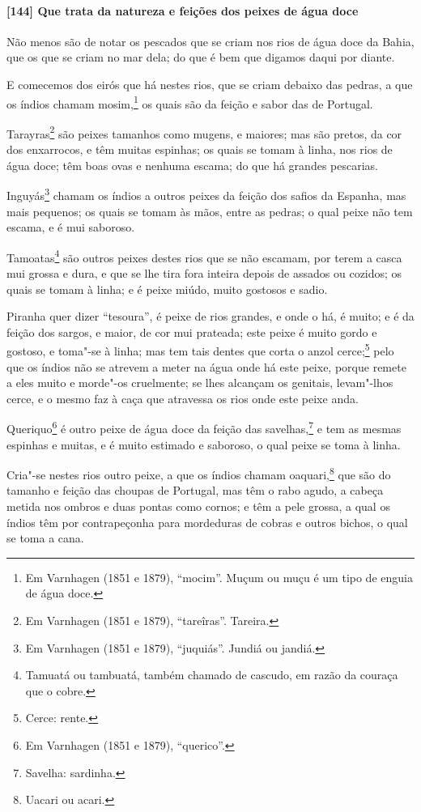 \begin{linenumbers}
\paragraph{[144] Que trata da natureza e feições dos peixes de água doce}\quad
Não menos são de notar os pescados que se criam nos rios de água doce da Bahia, que os que
se criam no mar dela; do que é bem que digamos daqui por diante.

E comecemos dos eirós que há nestes rios, que se criam debaixo das pedras, a que os índios
chamam mosim,\footnote{ Em Varnhagen (1851 e 1879), ``mocim''. Muçum ou muçu é um tipo de
enguia de água doce.} os quais são da feição e sabor das de Portugal.

Tarayras\footnote{ Em Varnhagen (1851 e 1879), ``tareîras''. Tareira.} são peixes tamanhos
como mugens, e maiores; mas são pretos, da cor dos enxarrocos, e têm muitas espinhas; os
quais se tomam à linha, nos rios de água doce; têm boas ovas e nenhuma escama; do que há
grandes pescarias.

Inguyás\footnote{ Em Varnhagen (1851 e 1879), ``juquiás''. Jundiá ou jandiá.} chamam os
índios a outros peixes da feição dos safios da Espanha, mas mais pequenos; os quais se
tomam às mãos, entre as pedras; o qual peixe não tem escama, e é mui saboroso.

Tamoatas\footnote{ Tamuatá ou tambuatá, também chamado de cascudo, em razão da couraça que
o cobre.} são outros peixes destes rios que se não escamam, por terem a casca mui grossa e
dura, e que se lhe tira fora inteira depois de assados ou cozidos; os quais se tomam à
linha; e é peixe miúdo, muito gostosos e sadio.

Piranha quer dizer ``tesoura'', é peixe de rios grandes, e onde o há, é muito; e é da
feição dos sargos, e maior, de cor mui prateada; este peixe é muito gordo e gostoso, e
toma"-se à linha; mas tem tais dentes que corta o anzol cerce;\footnote{ Cerce: rente.}
pelo que os índios não se atrevem a meter na água onde há este peixe, porque remete a eles
muito e morde"-os cruelmente; se lhes alcançam os genitais, levam"-lhos cerce, e o mesmo faz
à caça que atravessa os rios onde este peixe anda.

Queriquo\footnote{ Em Varnhagen (1851 e 1879), ``querico''.} é outro peixe de água doce da
feição das savelhas,\footnote{ Savelha: sardinha.} e tem as mesmas espinhas e muitas, e é
muito estimado e saboroso, o qual peixe se toma à linha.

Cria"-se nestes rios outro peixe, a que os índios chamam oaquari,\footnote{ Uacari ou
acari.} que são do tamanho e feição das choupas de Portugal, mas têm o rabo agudo, a
cabeça metida nos ombros e duas pontas como cornos; e têm a pele grossa, a qual os índios
têm por contrapeçonha para mordeduras de cobras e outros bichos, o qual se toma a cana.


\end{linenumbers}
